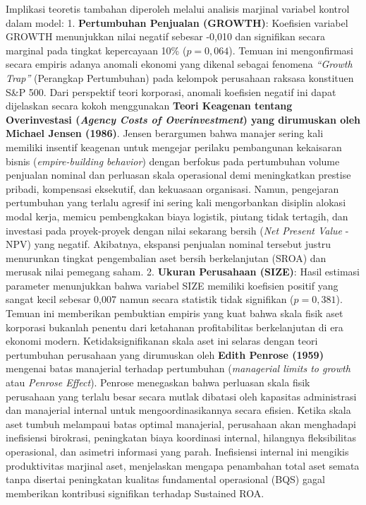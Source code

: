 \documentclass[12pt,a4paper]{article}
\begin{document}
Implikasi teoretis tambahan diperoleh melalui analisis marjinal variabel
kontrol dalam model: 1. \textbf{Pertumbuhan Penjualan (GROWTH)}:
Koefisien variabel GROWTH menunjukkan nilai negatif sebesar -0,010 dan
signifikan secara marginal pada tingkat kepercayaan 10\%
(\(p = 0,064\)). Temuan ini mengonfirmasi secara empiris adanya anomali
ekonomi yang dikenal sebagai fenomena \emph{``Growth Trap''} (Perangkap
Pertumbuhan) pada kelompok perusahaan raksasa konstituen S\&P 500. Dari
perspektif teori korporasi, anomali koefisien negatif ini dapat
dijelaskan secara kokoh menggunakan \textbf{Teori Keagenan tentang
Overinvestasi (\emph{Agency Costs of Overinvestment}) yang dirumuskan
oleh Michael Jensen (1986)}. Jensen berargumen bahwa manajer sering kali
memiliki insentif keagenan untuk mengejar perilaku pembangunan
kekaisaran bisnis (\emph{empire-building behavior}) dengan berfokus pada
pertumbuhan volume penjualan nominal dan perluasan skala operasional
demi meningkatkan prestise pribadi, kompensasi eksekutif, dan kekuasaan
organisasi. Namun, pengejaran pertumbuhan yang terlalu agresif ini
sering kali mengorbankan disiplin alokasi modal kerja, memicu
pembengkakan biaya logistik, piutang tidak tertagih, dan investasi pada
proyek-proyek dengan nilai sekarang bersih (\emph{Net Present Value} -
NPV) yang negatif. Akibatnya, ekspansi penjualan nominal tersebut justru
menurunkan tingkat pengembalian aset bersih berkelanjutan (SROA) dan
merusak nilai pemegang saham. 2. \textbf{Ukuran Perusahaan (SIZE)}:
Hasil estimasi parameter menunjukkan bahwa variabel SIZE memiliki
koefisien positif yang sangat kecil sebesar 0,007 namun secara statistik
tidak signifikan (\(p = 0,381\)). Temuan ini memberikan pembuktian
empiris yang kuat bahwa skala fisik aset korporasi bukanlah penentu dari
ketahanan profitabilitas berkelanjutan di era ekonomi modern.
Ketidaksignifikanan skala aset ini selaras dengan teori pertumbuhan
perusahaan yang dirumuskan oleh \textbf{Edith Penrose (1959)} mengenai
batas manajerial terhadap pertumbuhan (\emph{managerial limits to
growth} atau \emph{Penrose Effect}). Penrose menegaskan bahwa perluasan
skala fisik perusahaan yang terlalu besar secara mutlak dibatasi oleh
kapasitas administrasi dan manajerial internal untuk mengoordinasikannya
secara efisien. Ketika skala aset tumbuh melampaui batas optimal
manajerial, perusahaan akan menghadapi inefisiensi birokrasi,
peningkatan biaya koordinasi internal, hilangnya fleksibilitas
operasional, dan asimetri informasi yang parah. Inefisiensi internal ini
mengikis produktivitas marjinal aset, menjelaskan mengapa penambahan
total aset semata tanpa disertai peningkatan kualitas fundamental
operasional (BQS) gagal memberikan kontribusi signifikan terhadap
Sustained ROA.
\end{document}
